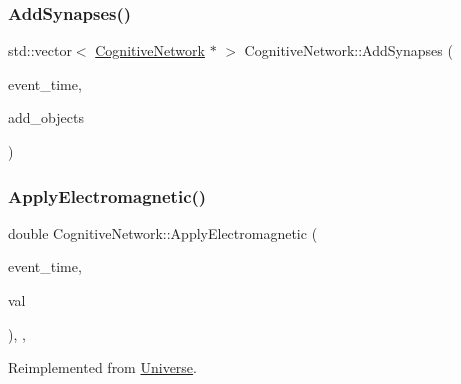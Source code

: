\mbox{\label{classCognitiveNetwork_a09d9e01cbd8596af7fac626ce2753643}} 
\subsubsection{\texorpdfstring{Add\+Synapses()}{AddSynapses()}}
{\footnotesize\ttfamily std\+::vector$<$ \mbox{\hyperlink{classCognitiveNetwork}{Cognitive\+Network}} $\ast$ $>$ Cognitive\+Network\+::\+Add\+Synapses (\begin{DoxyParamCaption}\item[{std\+::chrono\+::time\+\_\+point$<$ \mbox{\hyperlink{universe_8h_a0ef8d951d1ca5ab3cfaf7ab4c7a6fd80}{Clock}} $>$}]{event\+\_\+time,  }\item[{std\+::vector$<$ \mbox{\hyperlink{classCognitiveNetwork}{Cognitive\+Network}} $\ast$$>$}]{add\+\_\+objects }\end{DoxyParamCaption})}

\mbox{\label{classCognitiveNetwork_ae590ecb77db0a876425b9b74bcfe2bce}} 
\subsubsection{\texorpdfstring{Apply\+Electromagnetic()}{ApplyElectromagnetic()}}
{\footnotesize\ttfamily double Cognitive\+Network\+::\+Apply\+Electromagnetic (\begin{DoxyParamCaption}\item[{std\+::chrono\+::time\+\_\+point$<$ \mbox{\hyperlink{universe_8h_a0ef8d951d1ca5ab3cfaf7ab4c7a6fd80}{Clock}} $>$}]{event\+\_\+time,  }\item[{double}]{val }\end{DoxyParamCaption})\hspace{0.3cm}{\ttfamily [inline]}, {\ttfamily [final]}, {\ttfamily [virtual]}}



Reimplemented from \mbox{\hyperlink{classUniverse_a1f787da78fa196ba635db21a9e91dabb}{Universe}}.

\mbox{\label{classCognitiveNetwork_a9753f52c9e36ad44e9fac1d3e38a0770}} 
